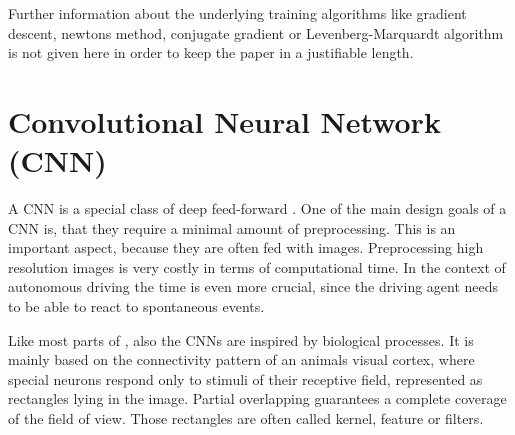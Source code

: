 Further information about the underlying training algorithms like gradient descent, newtons method, conjugate gradient or Levenberg-Marquardt algorithm is not given here in order to keep the paper in a justifiable length.  


\section{Convolutional Neural Network (CNN)}\label{sec:CNN}

A CNN is a special class of deep feed-forward \nns. One of the main design goals of a CNN is, that they require a minimal amount of preprocessing. This is an important aspect, because they are often fed with images. Preprocessing high resolution images is very costly in terms of computational time. In the context of autonomous driving the time is even more crucial, since the driving agent needs to be able to react to spontaneous events.

Like most parts of \nns, also the CNNs are inspired by biological processes. It is mainly based on the connectivity pattern of an animals visual cortex, where special neurons respond only to stimuli of their receptive field, represented as rectangles lying in the image. Partial overlapping guarantees a complete coverage of the field of view. Those rectangles are often called kernel, feature or filters.\cite{matsugu2003subject}



